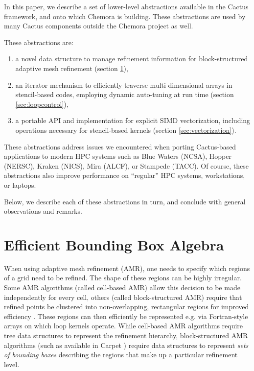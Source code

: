 \documentclass[conference]{IEEEtran}
\begin{document}
In this paper, we describe a set of lower-level abstractions available
in the Cactus framework, and onto which Chemora is building. These
abstractions are used by many Cactus components outside the Chemora
project as well.

These abstractions are:
\begin{enumerate}
  \item a novel data structure to manage refinement information for
    block-structured adaptive mesh refinement (section
    \ref{sec:bboxset}),
\item an iterator mechanism to efficiently traverse multi-dimensional
  arrays in stencil-based codes, employing dynamic auto-tuning at run
  time (section \ref{sec:loopcontrol}),
\item a portable API and implementation for explicit SIMD
  vectorization, including operations necessary
  for stencil-based kernels (section \ref{sec:vectorization}).
\end{enumerate}

These abstractions address issues we encountered when porting
Cactus-based applications to modern HPC systems such as Blue Waters
(NCSA), Hopper (NERSC), Kraken (NICS), Mira (ALCF), or Stampede
(TACC). Of course, these abstractions also improve performance on
``regular'' HPC systems, workstations, or laptops.

Below, we describe each of these abstractions in turn, and
conclude with general observations and remarks.



\section{Efficient Bounding Box Algebra}
\label{sec:bboxset}

When using adaptive mesh refinement (AMR), one needs to specify which
regions of a grid need to be refined. The shape of these regions can be
highly irregular. Some AMR algorithms (called cell-based AMR) allow
this decision to be made independently for every cell, others (called
block-structured AMR) require that refined points be clustered into
non-overlapping, rectangular regions for improved efficiency
\cite{Berger1984, bergerrigoutsos}. These
regions can then efficiently be represented e.g. via Fortran-style
arrays on which loop kernels operate. While cell-based AMR
algorithms require tree data structures to represent the refinement
hierarchy, block-structured AMR algorithms (such as available in
Carpet \cite{Schnetter:2003rb, Schnetter:2006pg, CarpetCode:web})
require data structures to represent \emph{sets of bounding
  boxes} describing the regions that make up a particular refinement
level.
\end{document}
